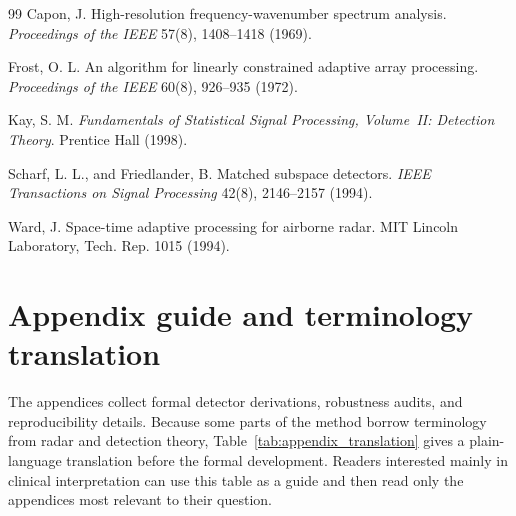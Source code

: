 \documentclass[11pt]{article}
\newif\ifSTAPPAPERONLY
\begin{document}
\begin{thebibliography}{99}
Capon, J.
\newblock High-resolution frequency-wavenumber spectrum analysis.
\newblock \emph{Proceedings of the IEEE} 57(8), 1408--1418 (1969).

Frost, O. L.
\newblock An algorithm for linearly constrained adaptive array processing.
\newblock \emph{Proceedings of the IEEE} 60(8), 926--935 (1972).

Kay, S. M.
\newblock \emph{Fundamentals of Statistical Signal Processing, Volume~II: Detection Theory}.
\newblock Prentice Hall (1998).

Scharf, L. L., and Friedlander, B.
\newblock Matched subspace detectors.
\newblock \emph{IEEE Transactions on Signal Processing} 42(8), 2146--2157 (1994).

Ward, J.
\newblock Space-time adaptive processing for airborne radar.
\newblock MIT Lincoln Laboratory, Tech. Rep. 1015 (1994).

\end{thebibliography}

\ifSTAPPAPERONLY\else
\appendix

\section{Appendix guide and terminology translation}
\label{app:appendix-guide}

The appendices collect formal detector derivations, robustness audits, and reproducibility details. Because some parts of the method borrow terminology from radar and detection theory, Table~\ref{tab:appendix_translation} gives a plain-language translation before the formal development. Readers interested mainly in clinical interpretation can use this table as a guide and then read only the appendices most relevant to their question.
\end{document}
